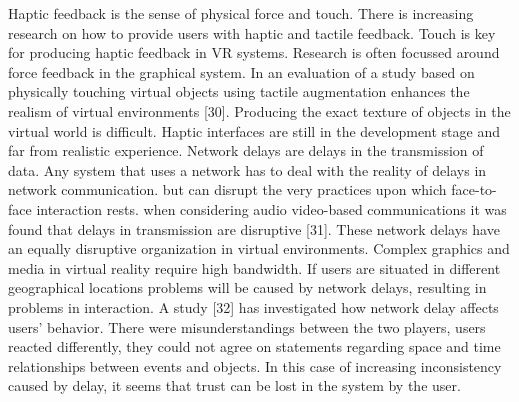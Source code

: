 Haptic feedback is the sense of physical force and touch. There is increasing research on how to provide users with haptic and tactile feedback. Touch is key for producing haptic feedback in VR systems. Research is often focussed around force feedback in the graphical system. In an evaluation of a study based on physically touching virtual objects using tactile augmentation enhances the realism of virtual environments [30]. Producing the exact texture of objects in the virtual world is difficult. Haptic interfaces are still in the development stage and far from realistic experience. 
Network delays are delays in the transmission of data. Any system that uses a network has to deal with the reality of delays in network communication. but can disrupt the very practices upon which face-to-face interaction rests. when considering audio video-based communications it was found that delays in transmission are disruptive [31]. These network delays have an equally disruptive organization in virtual environments. Complex graphics and media in virtual reality require high bandwidth. If users are situated in different geographical locations problems will be caused by network delays, resulting in problems in interaction. A study [32] has investigated how network delay affects users’ behavior. There were misunderstandings between the two players, users reacted differently, they could not agree on statements regarding space and time relationships between events and objects. In this case of increasing inconsistency caused by delay, it seems that trust can be lost in the system by the user.


